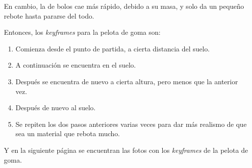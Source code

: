 \documentclass{article}
\begin{document}
En cambio, la de bolos cae más rápido, debido a su masa, y solo da un pequeño rebote hasta pararse del todo.


Entonces, los \textit{keyframes} para la pelota de goma son:

\begin{enumerate}
    \item Comienza desde el punto de partida, a cierta distancia del suelo.
    \item A continuación se encuentra en el suelo.
    \item Después se encuentra de nuevo a cierta altura, pero menos que la anterior vez.
    \item Después de nuevo al suelo.
    \item Se repiten los dos pasos anteriores varias veces para dar más realismo de que sea un material que rebota mucho.
\end{enumerate}

Y en la siguiente página se encuentran las fotos con los \textit{keyframes} de la pelota de goma.
\end{document}
